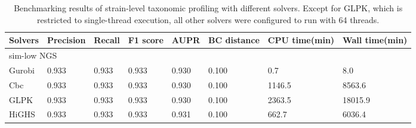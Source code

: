 \begin{table}[ht]
    \renewcommand\arraystretch{1.}
        \centering
        \small
        \setlength\tabcolsep{2pt} 
        \begin{tabular}{p{} p{1.5cm}<{\centering} p{1.5cm}<{\centering} p{1.5cm}<{\centering} p{1.5cm}<{\centering} p{1.5cm}<{\centering} p{2cm}<{\centering} p{2cm}<{\centering}} 
    
        \toprule
        Solvers & Precision & Recall & F1 score & AUPR & BC distance & CPU time(min) & Wall time(min) \\ 
        \midrule
        \multicolumn{4}{l}{sim-low NGS} \\
        \hline
        Gurobi & 0.933 & 0.933 & 0.933 & 0.930 & 0.100 & 0.7 & 8.0 \\
        Cbc & 0.933 & 0.933 & 0.933 & 0.930 & 0.100 & 1146.5 & 8563.6 \\
        GLPK & 0.933 & 0.933 & 0.933 & 0.930 & 0.100 & 2363.5 & 18015.9 \\
        HiGHS & 0.933 & 0.933 & 0.933 & 0.931 & 0.100 & 662.7 & 6036.4 \\
   
    \bottomrule
        \end{tabular}
        \vspace{1mm}
        \caption{Benchmarking results of strain-level taxonomic profiling with different solvers. Except for GLPK, which is restricted to single-thread execution, all other solvers were configured to run with 64 threads.}
        \label{tab:res_strain_solvers}
    \end{table}